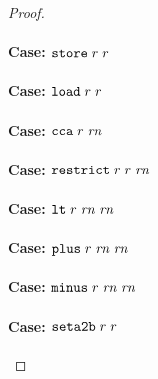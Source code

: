 \documentclass[a4paper]{article}
\begin{document}
\begin{proof}
\paragraph{Case: $\protect\tstore{\trg{r}}{\trg{r}}$}

\paragraph{Case: $\protect\tload{\trg{r}}{\trg{r}}$}

\paragraph{Case: $\protect\tcca{\trg{r}}{\trg{\rn}}$}

\paragraph{Case: $\protect\trestrict{\trg{r}}{\trg{r}}{\trg{\rn}}$}

\paragraph{Case: $\protect\tlt{\trg{r}}{\trg{\rn}}{\trg{\rn}}$}

\paragraph{Case: $\protect\tplus{\trg{r}}{\trg{\rn}}{\trg{\rn}}$}

\paragraph{Case: $\protect\tminus{\trg{r}}{\trg{\rn}}{\trg{\rn}}$}

\paragraph{Case: $\protect\tsetatob{\trg{r}}{\trg{r}}$}


\end{proof}
\end{document}
